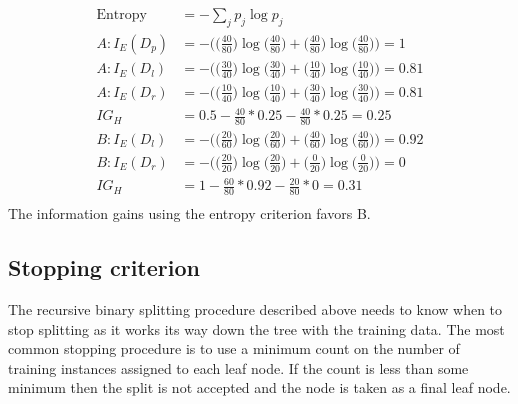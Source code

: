 \documentclass{article}
\begin{document}
\begin{align*}
\mbox{Entropy} &= - \sum_j p_j \log p_j\\
A: I_E(D_p) &= - \bigg(\Big(\frac{40}{80}\Big) \log \Big(\frac{40}{80}\Big) + \Big(\frac{40}{80}\Big) \log \Big(\frac{40}{80}\Big)\bigg) = 1\\
A: I_E(D_l)  &= - \bigg(\Big(\frac{30}{40}\Big) \log \Big(\frac{30}{40}\Big) + \Big(\frac{10}{40}\Big) \log \Big(\frac{10}{40}\Big)\bigg) = 0.81\\
A: I_E(D_r)  &= - \bigg(\Big(\frac{10}{40}\Big) \log \Big(\frac{10}{40}\Big) + \Big(\frac{30}{40}\Big) \log \Big(\frac{30}{40}\Big)\bigg) = 0.81\\
IG_{H} &= 0.5 - \frac{40}{80} * 0.25 - \frac{40}{80} * 0.25 = 0.25 \\
B: I_E(D_l)  &= - \bigg(\Big(\frac{20}{60}\Big) \log \Big(\frac{20}{60}\Big) + \Big(\frac{40}{60}\Big) \log \Big(\frac{40}{60}\Big)\bigg) = 0.92\\
B: I_E(D_r)  &= - \bigg(\Big(\frac{20}{20}\Big) \log \Big(\frac{20}{20}\Big) + \Big(\frac{0}{20}\Big) \log \Big(\frac{0}{20}\Big)\bigg) = 0\\
IG_{H} &= 1 - \frac{60}{80} * 0.92 - \frac{20}{80} * 0 = 0.31 \\
\end{align*}
The information gains using the entropy criterion favors B.


\subsection{Stopping criterion}
The recursive binary splitting procedure described above needs to know when to stop splitting as it works its way down the tree with the training data.
The most common stopping procedure is to use a minimum count on the number of training instances assigned to each leaf node. If the count is less than some minimum then the split is not accepted and the node is taken as a final leaf node.
\end{document}
